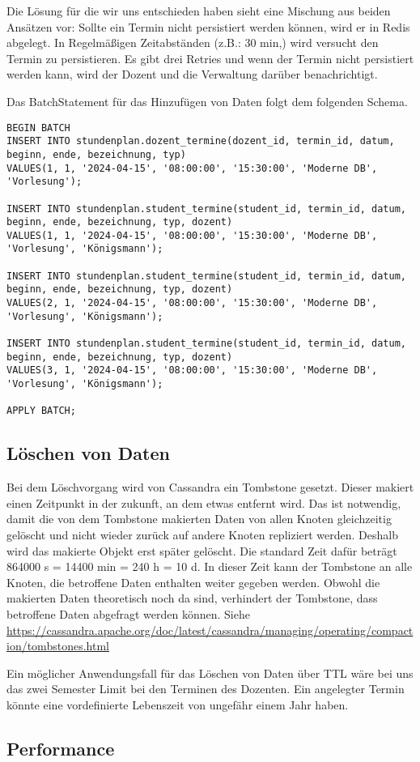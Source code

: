 Die Lösung für die wir uns entschieden haben sieht eine Mischung aus beiden Ansätzen vor: Sollte ein Termin nicht persistiert werden können, wird er in Redis abgelegt. In Regelmäßigen Zeitabständen (z.B.: 30 min,) wird versucht den Termin zu persistieren. Es gibt drei Retries und wenn der Termin nicht persistiert werden kann, wird der Dozent und die Verwaltung darüber benachrichtigt.

\newpage

Das BatchStatement für das Hinzufügen von Daten folgt dem folgenden Schema.
\begin{lstlisting}
BEGIN BATCH
INSERT INTO stundenplan.dozent_termine(dozent_id, termin_id, datum, beginn, ende, bezeichnung, typ) 
VALUES(1, 1, '2024-04-15', '08:00:00', '15:30:00', 'Moderne DB', 'Vorlesung');

INSERT INTO stundenplan.student_termine(student_id, termin_id, datum, beginn, ende, bezeichnung, typ, dozent) 
VALUES(1, 1, '2024-04-15', '08:00:00', '15:30:00', 'Moderne DB', 'Vorlesung', 'Königsmann');

INSERT INTO stundenplan.student_termine(student_id, termin_id, datum, beginn, ende, bezeichnung, typ, dozent) 
VALUES(2, 1, '2024-04-15', '08:00:00', '15:30:00', 'Moderne DB', 'Vorlesung', 'Königsmann');

INSERT INTO stundenplan.student_termine(student_id, termin_id, datum, beginn, ende, bezeichnung, typ, dozent) 
VALUES(3, 1, '2024-04-15', '08:00:00', '15:30:00', 'Moderne DB', 'Vorlesung', 'Königsmann');

APPLY BATCH;
\end{lstlisting}

\newpage

\subsection{Löschen von Daten}
Bei dem Löschvorgang wird von Cassandra ein Tombstone gesetzt. Dieser makiert einen Zeitpunkt in der zukunft, an dem etwas entfernt wird. Das ist notwendig, damit die von dem Tombstone makierten Daten von allen Knoten gleichzeitig gelöscht und nicht wieder zurück auf andere Knoten repliziert werden. Deshalb wird das makierte Objekt erst später gelöscht. Die standard Zeit dafür beträgt 864000 s = 14400 min = 240 h = 10 d. In dieser Zeit kann der Tombstone an alle Knoten, die betroffene Daten enthalten weiter gegeben werden. Obwohl die makierten Daten theoretisch noch da sind, verhindert der Tombstone, dass betroffene Daten abgefragt werden können. Siehe \href{https://cassandra.apache.org/doc/latest/cassandra/managing/operating/compaction/tombstones.html}{https://cassandra.apache.org/doc/latest/cassandra/managing/operating/compaction/tombstones.html}

\vspace{6pt}

Ein möglicher Anwendungsfall für das Löschen von Daten über TTL wäre bei uns das zwei Semester Limit bei den Terminen des Dozenten. Ein angelegter Termin könnte eine vordefinierte Lebenszeit von ungefähr einem Jahr haben.

\newpage

\subsection{Performance}
